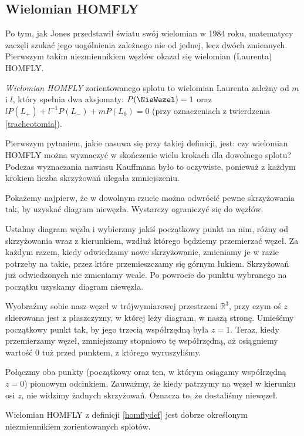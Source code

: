 \subsection{Wielomian HOMFLY}
Po tym, jak Jones przedstawił światu swój wielomian w 1984 roku, matematycy zaczęli szukać jego uogólnienia zależnego nie od jednej, lecz dwóch zmiennych.
Pierwszym takim niezmiennikiem węzłów okazał się wielomian (Laurenta) HOMFLY.

\begin{definicja}\label{homflydef}
\emph{Wielomian HOMFLY} zorientowanego splotu to wielomian Laurenta zależny od $m$ i $l$, który spełnia dwa  aksjomaty: $P(\NieWezel) = 1$ oraz $l P(L_+) + l^{-1} P(L_-) + mP(L_0) = 0$ (przy oznaczeniach z twierdzenia \ref{tracheotomia}).
\end{definicja}

Pierwszym pytaniem, jakie nasuwa się przy takiej definicji, jest: czy wielomian HOMFLY można wyznaczyć w skończenie wielu krokach dla dowolnego splotu?
Podczas wyznaczania nawiasu Kauffmana było to oczywiste, ponieważ z każdym krokiem liczba skrzyżowań ulegała zmniejszeniu.

Pokażemy najpierw, że w dowolnym rzucie można odwrócić pewne skrzyżowania tak, by uzyskać diagram niewęzła.
Wystarczy ograniczyć się do węzłów.

Ustalmy diagram węzła i wybierzmy jakiś początkowy punkt na nim, różny od skrzyżowania wraz z kierunkiem, wzdłuż którego będziemy przemierzać węzeł.
Za każdym razem, kiedy odwiedzamy nowe skrzyżowanie, zmieniamy je w razie potrzeby na takie, przez które przemieszczamy się górnym łukiem.
Skrzyżowań już odwiedzonych nie zmieniamy wcale.
Po powrocie do punktu wybranego na początku uzyskamy diagram niewęzła.

Wyobraźmy sobie nasz węzeł w trójwymiarowej przestrzeni $\mathbb R^3$, przy czym oś $z$ skierowana jest z płaszczyzny, w której leży diagram, w naszą stronę.
Umieśćmy początkowy punkt tak, by jego trzecią współrzędną była $z = 1$.
Teraz, kiedy przemierzamy węzeł, zmniejszamy stopniowo tę współrzędną, aż osiągniemy wartość $0$ tuż przed punktem, z którego wyruszyliśmy.

Połączmy oba punkty (początkowy oraz ten, w którym osiągamy współrzędną $z = 0$) pionowym odcinkiem.
Zauważmy, że kiedy patrzymy na węzeł w kierunku osi $z$, nie widzimy żadnych skrzyżowań.
Oznacza to, że dostaliśmy niewęzeł.

\begin{twierdzenie}
Wielomian HOMFLY z definicji \ref{homflydef} jest dobrze określonym niezmiennikiem zorientowanych splotów.
\end{twierdzenie}

